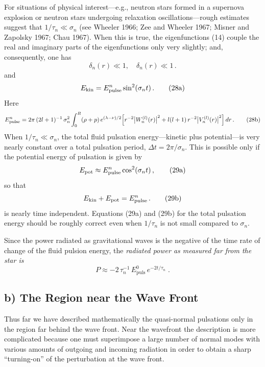 \documentclass[12pt]{article}
\begin{document}
For situations of physical interest---e.g., neutron stars formed in a supernova explosion or neutron stars undergoing relaxation oscillations---rough estimates suggest
that $1/\tau_n \ll \sigma_n$ (see Wheeler 1966; Zee and Wheeler 1967; Misner and Zapolsky 1967;
Chau 1967). When this is true, the eigenfunctions (14) couple the real and imaginary
parts of the eigenfunctions only very slightly; and, consequently, one has
%
\begin{equation}
\delta_n(r) \ll 1, \quad \delta_n(r) \ll 1 \,.
\tag{27}
\end{equation}
%
and
%
\begin{equation}
E_{\rm kin} = E_{\rm pulse}^n \sin^2(\sigma_n t) \,.
\tag{28a}
\end{equation}
%
Here
%
\begin{equation}
E_{\rm pulse}^n = 2\pi\,(2l+1)^{-1}\,\sigma_n^2
\int_0^R (\rho+p)\,e^{(\lambda-\nu)/2}
\Bigl[
r^{-2}\bigl|W_n^{(l)}(r)\bigr|^2
+ l(l+1)\,r^{-2}\bigl|V_n^{(l)}(r)\bigr|^2
\Bigr]\,dr \,.
\tag{28b}
\end{equation}
%
When $1/\tau_n \ll \sigma_n$, the total fluid pulsation energy---kinetic plus potential---is very
nearly constant over a total pulsation period, $\Delta t = 2\pi/\sigma_n$. This is possible only if the
potential energy of pulsation is given by
%
\begin{equation}
E_{\rm pot} \approx E_{\rm pulse}^n \cos^2(\sigma_n t) \,,
\tag{29a}
\end{equation}
%
so that
%
\begin{equation}
E_{\rm kin} + E_{\rm pot} = E_{\rm pulse}^n \,.
\tag{29b}
\end{equation}
%
is nearly time independent. Equations (29a) and (29b) for the total pulsation energy
should be roughly correct even when $1/\tau_n$ is not small compared to $\sigma_n$.

Since the power radiated as gravitational waves is the negative of the time rate of
change of the fluid pulsion energy, the \emph{radiated power as measured far from the star is}
%
\begin{equation}
  P \approx -2\,\tau_{n}^{-1}\, E_{\text{puls}}^{0}\, e^{-2t/\tau_{n}} \;.
  \label{eq:30}
\end{equation}

\subsection*{b) The Region near the Wave Front}

Thus far we have described mathematically the quasi-normal pulsations only in the
region far behind the wave front. Near the wavefront the description is more complicated because one must superimpose a large number of normal modes with various
amounts of outgoing and incoming radiation in order to obtain a sharp ``turning-on'' of
the perturbation at the wave front.
\end{document}
